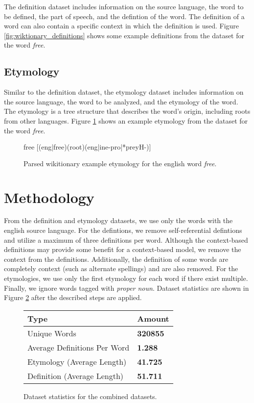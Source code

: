 \documentclass[11pt,a4paper]{article}
\begin{document}
The definition dataset includes information on the source language, the word to
be defined, the part of speech, and the defintion of the word. The definition of
a word can also contain a specific context in which the definition is used.
Figure \ref{fig:wiktionary_definitions} shows some example definitions from the
dataset for the word \textit{free}.

\subsection{Etymology}

Similar to the definition dataset, the etymology dataset includes information on
the source language, the word to be analyzed, and the etymology of the word. The
etymology is a tree structure that describes the word's origin, including roots
from other languages. Figure \ref{fig:wiktionary_etymology} shows an example
etymology from the dataset for the word \textit{free}.

\begin{figure}[h]
  \color{blue}free \color{black}[\color{green}(eng|free)\color{blue}(root)\color{red}(eng|ine-pro|*preyH-)\color{black}]
  \caption{Parsed wikitionary example etymology for the english word
    \textit{free}.}
  \label{fig:wiktionary_etymology}
\end{figure}

\section{Methodology}

From the definition and etymology datasets, we use only the words with the
english source language. For the defintions, we remove self-referential
defintions and utilize a maximum of three definitions per word. Although the
context-based definitions may provide some benefit for a context-based model, we
remove the context from the definitions. Additionally, the definition of some
words are completely context (such as alternate spellings) and are also removed.
For the etymologies, we use only the first etymology for each word if there
exist multiple. Finally, we ignore words tagged with \textit{proper noun}.
Dataset statistics are shown in Figure \ref{fig:dataset_stats} after the
described steps are applied.

\begin{figure}[h]
  \begin{tabular}{|l|l|}
    \hline
    \textbf{Type}                & \textbf{Amount} \\
    \hline\hline
    Unique Words                 & \textbf{320855} \\
    Average Definitions Per Word & \textbf{1.288}  \\
    Etymology (Average Length)   & \textbf{41.725} \\
    Definition (Average Length)  & \textbf{51.711} \\
    \hline
  \end{tabular}
  \caption{Dataset statistics for the combined datasets.}
  \label{fig:dataset_stats}
\end{figure}
\end{document}
